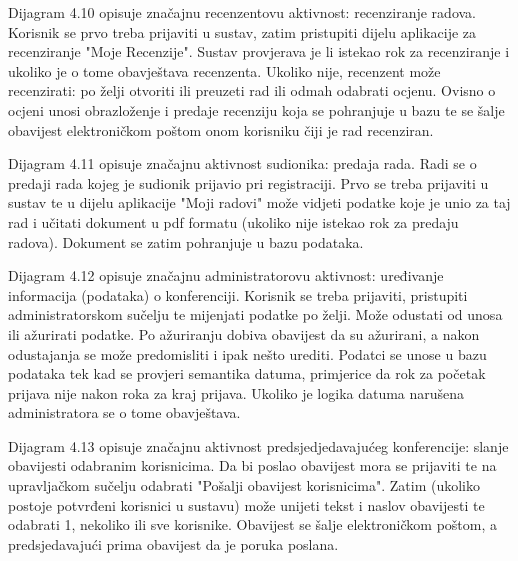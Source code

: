 			 Dijagram 4.10 opisuje značajnu recenzentovu aktivnost: recenziranje radova. Korisnik se prvo treba prijaviti u sustav, zatim pristupiti dijelu aplikacije za recenziranje "Moje Recenzije". Sustav provjerava je li istekao rok za recenziranje i ukoliko je o tome obavještava recenzenta. Ukoliko nije, recenzent može recenzirati: po želji otvoriti ili preuzeti rad ili odmah odabrati ocjenu. Ovisno o ocjeni unosi obrazloženje i predaje recenziju koja se pohranjuje u bazu te se šalje obavijest elektroničkom poštom onom korisniku čiji je rad recenziran.
			 
			 Dijagram 4.11 opisuje značajnu aktivnost sudionika: predaja rada. Radi se o predaji rada kojeg je sudionik prijavio pri registraciji. Prvo se treba prijaviti u sustav te u dijelu aplikacije "Moji radovi" može vidjeti podatke koje je unio za taj rad i učitati dokument u pdf formatu (ukoliko nije istekao rok za predaju radova). Dokument se zatim pohranjuje u bazu podataka.
			 
			 Dijagram 4.12 opisuje značajnu administratorovu aktivnost: uređivanje informacija (podataka) o konferenciji. Korisnik se treba prijaviti, pristupiti administratorskom sučelju te mijenjati podatke po želji. Može odustati od unosa ili ažurirati podatke. Po ažuriranju dobiva obavijest da su ažurirani, a nakon odustajanja se može predomisliti i ipak nešto urediti. Podatci se unose u bazu podataka tek kad se provjeri semantika datuma, primjerice da rok za početak prijava nije nakon roka za kraj prijava. Ukoliko je logika datuma narušena administratora se o tome obavještava.
			 
			 Dijagram 4.13 opisuje značajnu aktivnost predsjedjedavajućeg konferencije: slanje obavijesti odabranim korisnicima. Da bi poslao obavijest mora se prijaviti te na upravljačkom sučelju odabrati "Pošalji obavijest korisnicima". Zatim (ukoliko postoje potvrđeni korisnici u sustavu) može unijeti tekst i naslov obavijesti te odabrati 1, nekoliko ili sve korisnike. Obavijest se šalje elektroničkom poštom, a predsjedavajući prima obavijest da je poruka poslana.
			 
